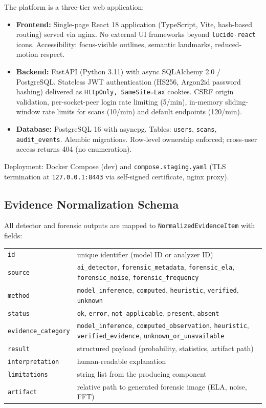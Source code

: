 \documentclass[10pt,conference,compsoc]{IEEEtran}
\begin{document}
The platform is a three-tier web application:
\begin{itemize}
  \item \textbf{Frontend:} Single-page React 18 application (TypeScript, Vite, hash-based routing) served via nginx. No external UI frameworks beyond \texttt{lucide-react} icons. Accessibility: focus-visible outlines, semantic landmarks, reduced-motion respect.
  \item \textbf{Backend:} FastAPI (Python 3.11) with async SQLAlchemy 2.0 / PostgreSQL. Stateless JWT authentication (HS256, Argon2id password hashing) delivered as \texttt{HttpOnly, SameSite=Lax} cookies. CSRF origin validation, per-socket-peer login rate limiting (5/min), in-memory sliding-window rate limits for scans (10/min) and default endpoints (120/min).
  \item \textbf{Database:} PostgreSQL 16 with asyncpg. Tables: \texttt{users}, \texttt{scans}, \texttt{audit\_events}. Alembic migrations. Row-level ownership enforced; cross-user access returns 404 (no enumeration).
\end{itemize}

Deployment: Docker Compose (dev) and \texttt{compose.staging.yaml} (TLS termination at \texttt{127.0.0.1:8443} via self-signed certificate, nginx proxy).

\subsection{Evidence Normalization Schema}
\label{sec:evidence-schema}

All detector and forensic outputs are mapped to \texttt{NormalizedEvidenceItem} with fields:
\begin{tabular}{ll}
  \texttt{id} & unique identifier (model ID or analyzer ID)\\
  \texttt{source} & \texttt{ai\_detector}, \texttt{forensic\_metadata}, \texttt{forensic\_ela}, \texttt{forensic\_noise}, \texttt{forensic\_frequency}\\
  \texttt{method} & \texttt{model\_inference}, \texttt{computed}, \texttt{heuristic}, \texttt{verified}, \texttt{unknown}\\
  \texttt{status} & \texttt{ok}, \texttt{error}, \texttt{not\_applicable}, \texttt{present}, \texttt{absent}\\
  \texttt{evidence\_category} & \texttt{model\_inference}, \texttt{computed\_observation}, \texttt{heuristic}, \texttt{verified\_evidence}, \texttt{unknown\_or\_unavailable}\\
  \texttt{result} & structured payload (probability, statistics, artifact path)\\
  \texttt{interpretation} & human-readable explanation\\
  \texttt{limitations} & string list from the producing component\\
  \texttt{artifact} & relative path to generated forensic image (ELA, noise, FFT)\\
\end{tabular}
\end{document}

